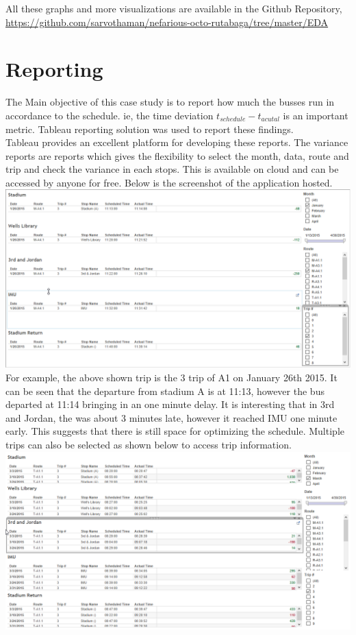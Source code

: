 \documentclass[12pt]{article}\usepackage[]{graphicx}\usepackage[]{color}
\begin{document}
All these graphs and more visualizations are available in the Github Repository, \url{https://github.com/sarvothaman/nefarious-octo-rutabaga/tree/master/EDA}
\section{Reporting}
The Main objective of this case study is to report how much the busses run in accordance to the schedule. ie, the time deviation $t_{schedule}-t_{acutal}$ is an important metric. Tableau reporting solution was used to report these findings. \\
Tableau provides an excellent platform for developing these reports. The variance reports are reports which gives the flexibility to select the month, data, route and trip and check the variance in each stops. This is available on cloud and can be accessed by anyone for free. Below is the screenshot of the application hosted.\\
\includegraphics[scale=0.4]{resources/tableau4}\\[1cm] 
For example, the above shown trip is the 3 trip of A1 on January 26th 2015. It can be seen that the departure from stadium A is at 11:13, however the bus departed at 11:14 bringing in an one minute delay. It is interesting that in 3rd and Jordan, the was about 3 minutes late, however it reached IMU one minute early. This suggests that there is still space for optimizing the schedule. Multiple trips can also be selected as shown below to access trip information.
\includegraphics[scale=0.4]{resources/tableau5}\\[1cm] 
\end{document}
